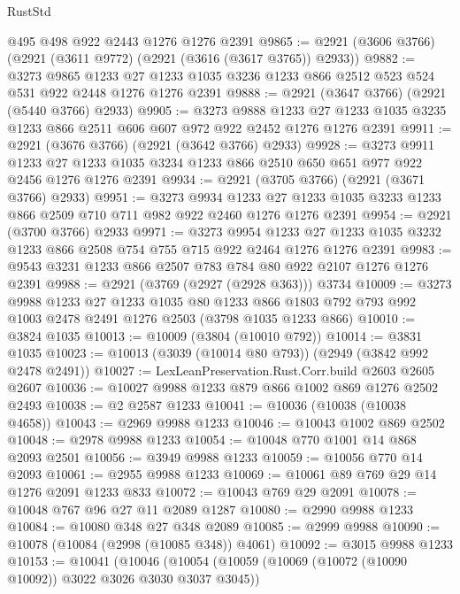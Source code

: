 \begin{lexlean}{RustStd}
\begin{coremodule}
    @495
    @498
    @922
    @2443
    @1276
    @1276
    @2391
@9865 := @2921 (@3606 @3766) (@2921 (@3611 @9772) (@2921 (@3616 (@3617 @3765)) @2933))
@9882 := @3273
    @9865
    @1233
    @27
    @1233
    @1035
    @3236
    @1233
    @866
    @2512
    @523
    @524
    @531
    @922
    @2448
    @1276
    @1276
    @2391
@9888 := @2921 (@3647 @3766) (@2921 (@5440 @3766) @2933)
@9905 := @3273
    @9888
    @1233
    @27
    @1233
    @1035
    @3235
    @1233
    @866
    @2511
    @606
    @607
    @972
    @922
    @2452
    @1276
    @1276
    @2391
@9911 := @2921 (@3676 @3766) (@2921 (@3642 @3766) @2933)
@9928 := @3273
    @9911
    @1233
    @27
    @1233
    @1035
    @3234
    @1233
    @866
    @2510
    @650
    @651
    @977
    @922
    @2456
    @1276
    @1276
    @2391
@9934 := @2921 (@3705 @3766) (@2921 (@3671 @3766) @2933)
@9951 := @3273
    @9934
    @1233
    @27
    @1233
    @1035
    @3233
    @1233
    @866
    @2509
    @710
    @711
    @982
    @922
    @2460
    @1276
    @1276
    @2391
@9954 := @2921 (@3700 @3766) @2933
@9971 := @3273
    @9954
    @1233
    @27
    @1233
    @1035
    @3232
    @1233
    @866
    @2508
    @754
    @755
    @715
    @922
    @2464
    @1276
    @1276
    @2391
@9983 := @9543 @3231 @1233 @866 @2507 @783 @784 @80 @922 @2107 @1276 @1276 @2391
@9988 := @2921 (@3769 (@2927 (@2928 @363))) @3734
@10009 := @3273
    @9988
    @1233
    @27
    @1233
    @1035
    @80
    @1233
    @866
    @1803
    @792
    @793
    @992
    @1003
    @2478
    @2491
    @1276
    @2503
    (@3798 @1035 @1233 @866)
@10010 := @3824 @1035
@10013 := @10009 (@3804 (@10010 @792))
@10014 := @3831 @1035
@10023 := @10013 (@3039 (@10014 @80 @793)) (@2949 (@3842 @992 @2478 @2491))
@10027 := LexLeanPreservation.Rust.Corr.build @2603 @2605 @2607
@10036 := @10027 @9988 @1233 @879 @866 @1002 @869 @1276 @2502 @2493
@10038 := @2 @2587 @1233
@10041 := @10036 (@10038 (@10038 @4658))
@10043 := @2969 @9988 @1233
@10046 := @10043 @1002 @869 @2502
@10048 := @2978 @9988 @1233
@10054 := @10048 @770 @1001 @14 @868 @2093 @2501
@10056 := @3949 @9988 @1233
@10059 := @10056 @770 @14 @2093
@10061 := @2955 @9988 @1233
@10069 := @10061 @89 @769 @29 @14 @1276 @2091 @1233 @833
@10072 := @10043 @769 @29 @2091
@10078 := @10048 @767 @96 @27 @11 @2089 @1287
@10080 := @2990 @9988 @1233
@10084 := @10080 @348 @27 @348 @2089
@10085 := @2999 @9988
@10090 := @10078 (@10084 (@2998 (@10085 @348)) @4061)
@10092 := @3015 @9988 @1233
@10153 := @10041
    (@10046
      (@10054
        (@10059 (@10069 (@10072 (@10090 @10092)) @3022 @3026 @3030 @3037 @3045))

\end{coremodule}
\end{lexlean}

